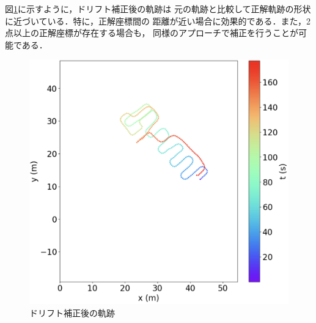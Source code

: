 図\ref{fig:pdr-remove-drift}に示すように，ドリフト補正後の軌跡は
元の軌跡と比較して正解軌跡の形状に近づいている．特に，正解座標間の
距離が近い場合に効果的である．また，2点以上の正解座標が存在する場合も，
同様のアプローチで補正を行うことが可能である．

\begin{figure}[H]
	\centering
	\includegraphics[width=\linewidth]{image/pdr-remove-drift-two.jpg}
	\caption{ドリフト補正後の軌跡}    \label{fig:pdr-remove-drift}
\end{figure}

